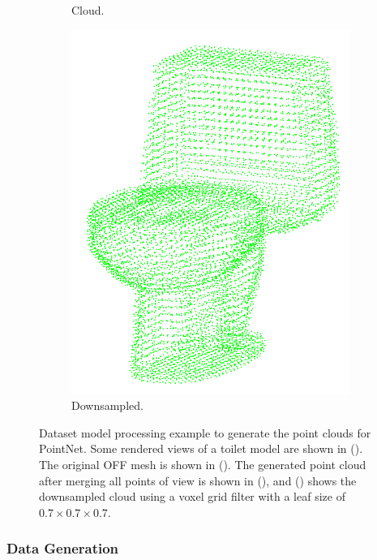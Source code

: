 \begin{figure}[!htb]
\begin{subfigure}{0.32\linewidth}
    \caption{Cloud.}
    \label{fig:objrecog:dataproc:cloud}
  \end{subfigure}
  \begin{subfigure}{0.32\linewidth}
    \includegraphics[width=0.9\linewidth]{Figures/ObjRecog/toilet_cloud_downsampled.png}
    \caption{Downsampled.}
    \label{fig:objrecog:dataproc:downsampled}
  \end{subfigure}
  \caption{Dataset model processing example to generate the point clouds for PointNet. Some rendered views of a toilet model are shown in (). The original \ac{OFF} mesh is shown in (). The generated point cloud after merging all points of view is shown in (), and () shows the downsampled cloud using a voxel grid filter with a leaf size of $0.7 \times 0.7 \times 0.7$.}
  \label{fig:objrecog:pointnetarchdata}
\end{figure}

\subsubsection{Data Generation}

